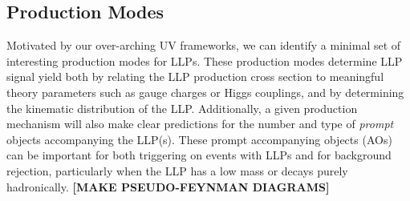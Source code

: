 \subsection{Production Modes}
\label{SM:secProduction_modes}

Motivated by our over-arching UV frameworks, we can identify a minimal set of interesting production modes for LLPs.
These production modes determine LLP signal yield both by relating the  LLP production cross section to meaningful theory parameters such as gauge charges or Higgs couplings, and by determining the kinematic distribution of the LLP.  Additionally, a given production mechanism will also  make clear predictions for the number and type of {\em prompt} objects accompanying the LLP(s).  These prompt accompanying objects (AOs) can be important for both triggering on events with LLPs and for background rejection, particularly when the LLP has a low mass or decays purely hadronically.  {\bf [MAKE PSEUDO-FEYNMAN DIAGRAMS]}

